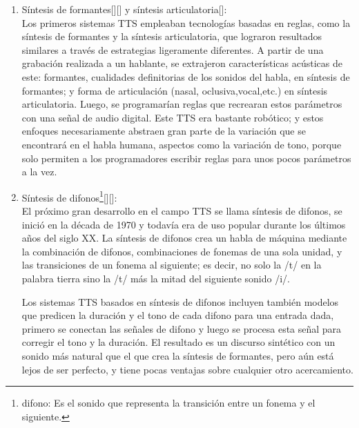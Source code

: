 \begin{enumerate}
	\item  Síntesis de formantes[\cite{tordera2011linguistica}][\cite{rodriguez2013sintetizador}] y síntesis articulatoria[\cite{hernandez2018sintesis}]: \\Los primeros sistemas TTS empleaban tecnologías basadas en reglas, como la síntesis de formantes y la síntesis articulatoria, que lograron resultados similares a través de estrategias ligeramente diferentes. A partir de una grabación realizada a un hablante, se extrajeron características acústicas de este: formantes, cualidades definitorias de los sonidos del habla, en síntesis de formantes; y forma de articulación (nasal, oclusiva,vocal,etc.) en síntesis articulatoria. Luego, se programarían reglas que recrearan estos parámetros con una señal de audio digital. Este TTS era bastante robótico; y estos enfoques necesariamente abstraen gran parte de la variación que se encontrará en el habla humana, aspectos como la variación de tono, porque solo permiten a los programadores escribir reglas para unos pocos parámetros a la vez.
	
	\item Síntesis de difonos\footnote{difono: Es el sonido que representa la transición entre un fonema y el siguiente. }[\cite{beutnagel1998diphone}][\cite{al2009arabic}]: \\ El próximo gran desarrollo en el campo TTS se llama síntesis de difonos, se inició en la década de 1970 y todavía era de uso popular durante los últimos años del siglo XX. La síntesis de difonos crea  un habla de máquina mediante la combinación de difonos, combinaciones de fonemas de una sola unidad, y las transiciones de un fonema al siguiente; es decir, no solo la /t/ en la palabra tierra sino la /t/ más la mitad del siguiente sonido /i/. 
	
	Los sistemas TTS basados en síntesis de difonos incluyen también modelos que predicen la duración y el tono de cada difono para una entrada dada, primero se conectan las señales de difono y luego se procesa esta señal para corregir el tono y la duración. El resultado es un discurso  sintético con un sonido más natural que el que crea la síntesis de formantes, pero aún está lejos de ser perfecto, y tiene pocas ventajas sobre cualquier otro acercamiento. 
	

\end{enumerate}
